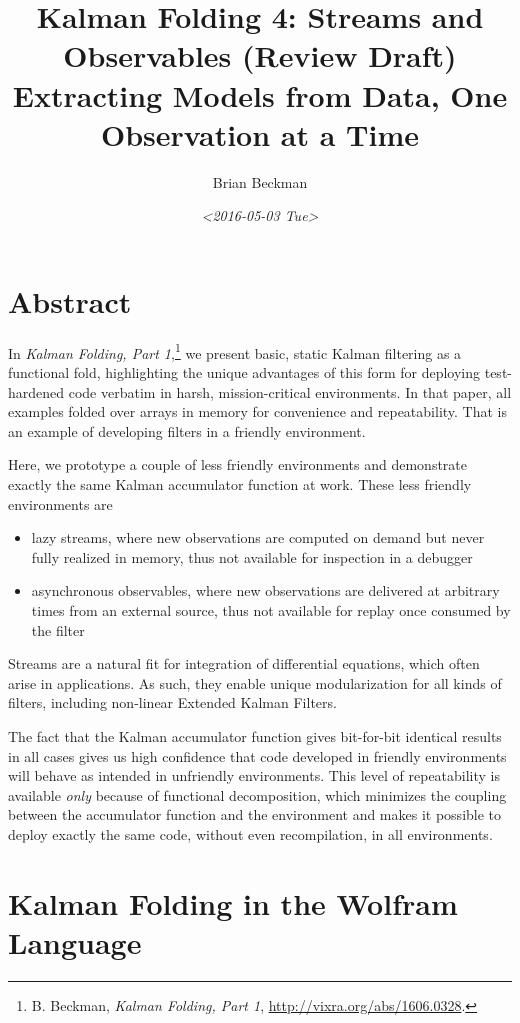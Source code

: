 \documentclass[10pt,oneside,x11names]{article}
\author{Brian Beckman}
\date{\textit{<2016-05-03 Tue>}}
\title{Kalman Folding 4: Streams and Observables (Review Draft)\\\medskip
\large Extracting Models from Data, One Observation at a Time}
\begin{document}
\maketitle
\setcounter{tocdepth}{2}
\tableofcontents


\section{Abstract}
\label{sec:orgheadline1}

In \emph{Kalman Folding, Part 1},\footnote{B. Beckman, \emph{Kalman Folding, Part 1}, \url{http://vixra.org/abs/1606.0328}.} we present basic, static Kalman filtering
as a functional fold, highlighting the unique advantages of this form for
deploying test-hardened code verbatim in harsh, mission-critical environments.
In that paper, all examples folded over arrays in memory for convenience and
repeatability. That is an example of developing filters in a friendly
environment.

Here, we prototype a couple of less friendly environments and demonstrate
exactly the same Kalman accumulator function at work. These less friendly
environments are
\begin{itemize}
\item lazy streams, where new observations are computed on demand but never fully
realized in memory, thus not available for inspection in a debugger
\item asynchronous observables, where new observations are delivered at arbitrary
times from an external source, thus not available for replay once consumed by
the filter
\end{itemize}

Streams are a natural fit for integration of differential equations, which often
arise in applications. As such, they enable unique modularization for all kinds
of filters, including non-linear Extended Kalman Filters.

The fact that the Kalman accumulator function gives bit-for-bit identical
results in all cases gives us high confidence that code developed in friendly
environments will behave as intended in unfriendly environments. This level of
repeatability is available \emph{only} because of functional decomposition, which
minimizes the coupling between the accumulator function and the environment and
makes it possible to deploy exactly the same code, without even recompilation,
in all environments.

\section{Kalman Folding in the Wolfram Language}
\label{sec:orgheadline3}
\end{document}
